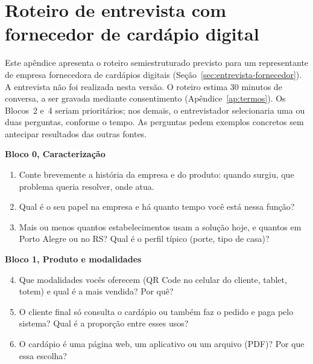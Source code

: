 \chapter{Roteiro de entrevista com fornecedor de cardápio digital}
\label{ap:roteiro-fornecedor}

Este apêndice apresenta o roteiro semiestruturado previsto para um representante de empresa fornecedora de cardápios digitais (Seção~\ref{sec:entrevista-fornecedor}). A entrevista não foi realizada nesta versão. O roteiro estima 30 minutos de conversa, a ser gravada mediante consentimento (Apêndice~\ref{ap:termos}). Os Blocos~2 e~4 seriam prioritários; nos demais, o entrevistador selecionaria uma ou duas perguntas, conforme o tempo. As perguntas pedem exemplos concretos sem antecipar resultados das outras fontes.

\noindent\textbf{Bloco 0, Caracterização}
\begin{enumerate}
	\item Conte brevemente a história da empresa e do produto: quando surgiu, que problema queria resolver, onde atua.
	\item Qual é o seu papel na empresa e há quanto tempo você está nessa função?
	\item Mais ou menos quantos estabelecimentos usam a solução hoje, e quantos em Porto Alegre ou no RS? Qual é o perfil típico (porte, tipo de casa)?
\end{enumerate}

\noindent\textbf{Bloco 1, Produto e modalidades}
\begin{enumerate}\setcounter{enumi}{3}
	\item Que modalidades vocês oferecem (QR Code no celular do cliente, tablet, totem) e qual é a mais vendida? Por quê?
	\item O cliente final só consulta o cardápio ou também faz o pedido e paga pelo sistema? Qual é a proporção entre esses usos?
	\item O cardápio é uma página web, um aplicativo ou um arquivo (PDF)? Por que essa escolha?
\end{enumerate}

